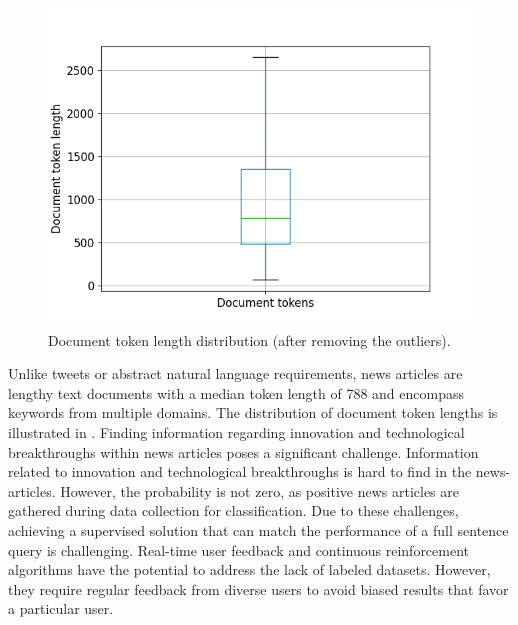 \begin{figure}[h]
	\centering
	\includegraphics[width=.65\textwidth]{images/keynotes_images/token_length_boxplot.png}
	\caption[Document length distribution.]{Document token length distribution (after removing the outliers). \label{fig:token_length_distribution}}
\end{figure}

Unlike tweets or abstract natural language requirements, news articles are lengthy text documents with a median token length of 788 and encompass keywords from multiple domains. The distribution of document token lengths is illustrated in . Finding information regarding innovation and technological breakthroughs within news articles poses a significant challenge. Information related to innovation and technological breakthroughs is hard to find in the news-articles. However, the probability is not zero, as positive news articles are gathered during data collection for classification. Due to these challenges, achieving a supervised solution that can match the performance of a full sentence query is challenging. Real-time user feedback and continuous reinforcement algorithms have the potential to address the lack of labeled datasets. However, they require regular feedback from diverse users to avoid biased results that favor a particular user.



